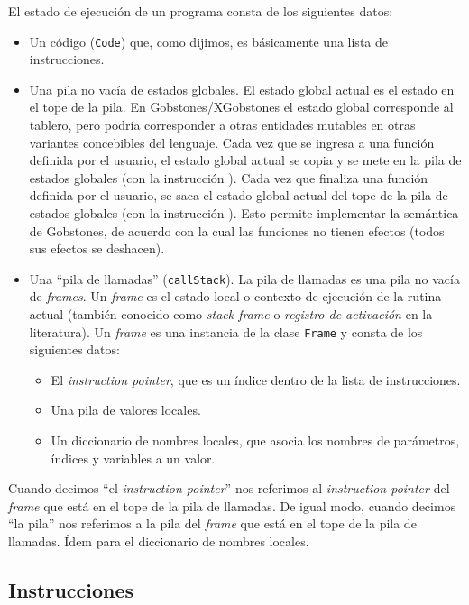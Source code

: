 \documentclass{article}
\begin{document}
El estado de ejecuci\'on de un programa consta de los siguientes datos:
\begin{itemize}
\item Un c\'odigo (\texttt{Code}) que, como dijimos, es b\'asicamente una lista de instrucciones.
\item Una pila no vac\'ia de estados globales.
      El estado global actual es el estado en el tope de la pila.
      En Gobstones/XGobstones el estado global corresponde al tablero,
      pero podr\'ia corresponder a otras entidades mutables en otras variantes
      concebibles del lenguaje.
      Cada vez que se ingresa a una funci\'on definida por el usuario,
      el estado global actual se copia y se mete en la pila de estados globales
      (con la instrucci\'on ).
      Cada vez que finaliza una funci\'on definida por el usuario,
      se saca el estado global actual del tope de la pila de estados globales
      (con la instrucci\'on ).
      Esto permite implementar la sem\'antica de Gobstones,
      de acuerdo con la cual las funciones no tienen efectos (todos sus efectos
      se deshacen).
\item Una ``pila de llamadas'' (\texttt{callStack}).
      La pila de llamadas es una pila no vac\'ia de {\em frames}.
      Un {\em frame} es el estado local
      o contexto de ejecuci\'on de la rutina actual (tambi\'en conocido como
      {\em stack frame} o {\em registro de activaci\'on} en la literatura).
      Un {\em frame} es una instancia de la
      clase \texttt{Frame} y consta de los siguientes datos:
      \begin{itemize}
      \item El {\em instruction pointer}, que es un \'indice dentro de la lista de instrucciones.
      \item Una pila de valores locales.
      \item Un diccionario de nombres locales, que asocia los nombres de
            par\'ametros, \'indices y variables a un valor.
      \end{itemize}
\end{itemize}
Cuando decimos ``el {\em instruction pointer}''
nos referimos al {\em instruction pointer} del {\em frame} que est\'a en el tope de la pila de llamadas.
De igual modo, cuando decimos ``la pila''
nos referimos a la pila del {\em frame} que est\'a en el tope de la pila de llamadas.
\'Idem para el diccionario de nombres locales.

\subsection{Instrucciones}
\end{document}
